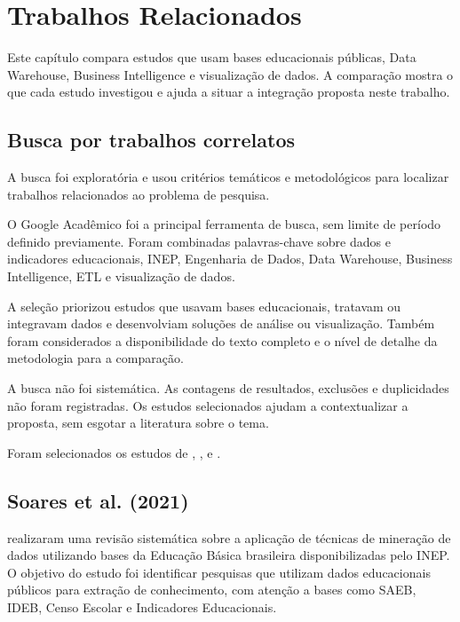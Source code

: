 \chapter[Trabalhos Relacionados]{Trabalhos Relacionados}

Este capítulo compara estudos que usam bases educacionais públicas, Data Warehouse, Business Intelligence e visualização de dados. A comparação mostra o que cada estudo investigou e ajuda a situar a integração proposta neste trabalho.

\section{Busca por trabalhos correlatos}

A busca foi exploratória e usou critérios temáticos e metodológicos para localizar trabalhos relacionados ao problema de pesquisa.

O Google Acadêmico foi a principal ferramenta de busca, sem limite de período definido previamente. Foram combinadas palavras-chave sobre dados e indicadores educacionais, INEP, Engenharia de Dados, Data Warehouse, Business Intelligence, ETL e visualização de dados.

A seleção priorizou estudos que usavam bases educacionais, tratavam ou integravam dados e desenvolviam soluções de análise ou visualização. Também foram considerados a disponibilidade do texto completo e o nível de detalhe da metodologia para a comparação.

A busca não foi sistemática. As contagens de resultados, exclusões e duplicidades não foram registradas. Os estudos selecionados ajudam a contextualizar a proposta, sem esgotar a literatura sobre o tema.

Foram selecionados os estudos de , ,  e .

\section{Soares et al. (2021)}

 realizaram uma revisão sistemática sobre a aplicação de técnicas de mineração de dados utilizando bases da Educação Básica brasileira disponibilizadas pelo INEP. O objetivo do estudo foi identificar pesquisas que utilizam dados educacionais públicos para extração de conhecimento, com atenção a bases como SAEB, IDEB, Censo Escolar e Indicadores Educacionais.

